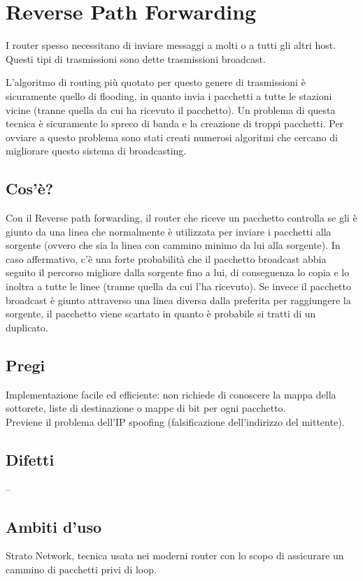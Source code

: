 \section{Reverse Path Forwarding}

I router spesso necessitano di inviare messaggi a molti o a tutti gli altri host. Questi tipi di trasmissioni sono dette trasmissioni broadcast.

L’algoritmo di routing più quotato per questo genere di trasmissioni è sicuramente quello di flooding, in quanto invia i pacchetti a tutte le stazioni vicine (tranne quella da cui ha ricevuto il pacchetto). Un problema di questa tecnica è sicuramente lo spreco di banda e la creazione di troppi pacchetti.
Per ovviare a questo problema sono stati creati numerosi algoritmi che cercano di migliorare questo sistema di broadcasting.

\subsection{Cos'è?}
Con il Reverse path forwarding, il router che riceve un pacchetto controlla se gli è giunto da una linea che normalmente è utilizzata per inviare i pacchetti alla sorgente (ovvero che sia la linea con cammino minimo da lui alla sorgente). In caso affermativo, c’è una forte probabilità che il pacchetto broadcast abbia seguito il percorso migliore dalla sorgente fino a lui, di conseguenza lo copia e lo inoltra a tutte le linee (tranne quella da cui l’ha ricevuto). Se invece il pacchetto broadcast è giunto attraverso una linea diversa dalla preferita per raggiungere la sorgente, il pacchetto viene scartato in quanto è probabile si tratti di un duplicato.


\subsection{Pregi}
Implementazione facile ed efficiente: non richiede di conoscere la mappa della sottorete, liste di destinazione o mappe di bit per ogni pacchetto.\\
Previene il problema dell'IP spoofing (falsificazione dell'indirizzo del mittente).
\subsection{Difetti}
--
\subsection{Ambiti d'uso}
Strato Network, tecnica usata nei moderni router con lo scopo di assicurare un cammino di pacchetti privi di loop.

